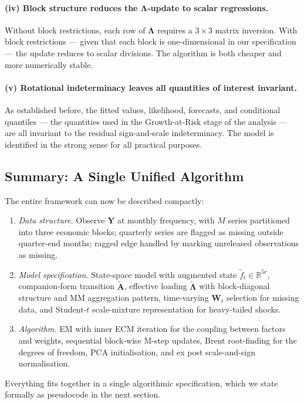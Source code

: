 \documentclass[11pt, a4paper, oneside]{article}
\newcommand{\mL}{\boldsymbol{\Lambda}}
\begin{document}
\paragraph{(iv) Block structure reduces the $\mL$-update to scalar regressions.}
Without block restrictions, each row of $\mL$ requires a
$3 \times 3$ matrix inversion. With block restrictions — given that
each block is one-dimensional in our specification — the update
reduces to scalar divisions. The algorithm is both cheaper and more
numerically stable.

\paragraph{(v) Rotational indeterminacy leaves all quantities of interest invariant.}
As established before, the
fitted values, likelihood, forecasts, and conditional quantiles —
the quantities used in the Growth-at-Risk stage of the analysis —
are all invariant to the residual sign-and-scale indeterminacy. The
model is identified in the strong sense for all practical purposes.

\subsection{Summary: A Single Unified Algorithm}

The entire framework can now be described compactly:
\begin{enumerate}[leftmargin=1.5em, itemsep=3pt]
    \item \emph{Data structure.} Observe $\mathbf{Y}$ at monthly
          frequency, with $M$ series partitioned into three economic
          blocks; quarterly series are flagged as missing outside
          quarter-end months; ragged edge handled by marking unreleased
          observations as missing.
    \item \emph{Model specification.} State-space model with augmented
          state $\tilde{f}_t \in \mathbb{R}^{5r}$, companion-form
          transition $\tilde{\mathbf{A}}$, effective loading
          $\tilde{\mL}$ with block-diagonal structure and
          MM aggregation pattern, time-varying $\mathbf{W}_t$ selection
          for missing data, and Student-$t$ scale-mixture
          representation for heavy-tailed shocks.
    \item \emph{Algorithm.} EM with inner ECM iteration for the
          coupling between factors and weights, sequential block-wise
          M-step updates, Brent root-finding for the degrees of
          freedom, PCA initialisation, and ex post scale-and-sign
          normalisation.
\end{enumerate}
Everything fits together in a single algorithmic specification, which
we state formally as pseudocode in the next section.
\end{document}
